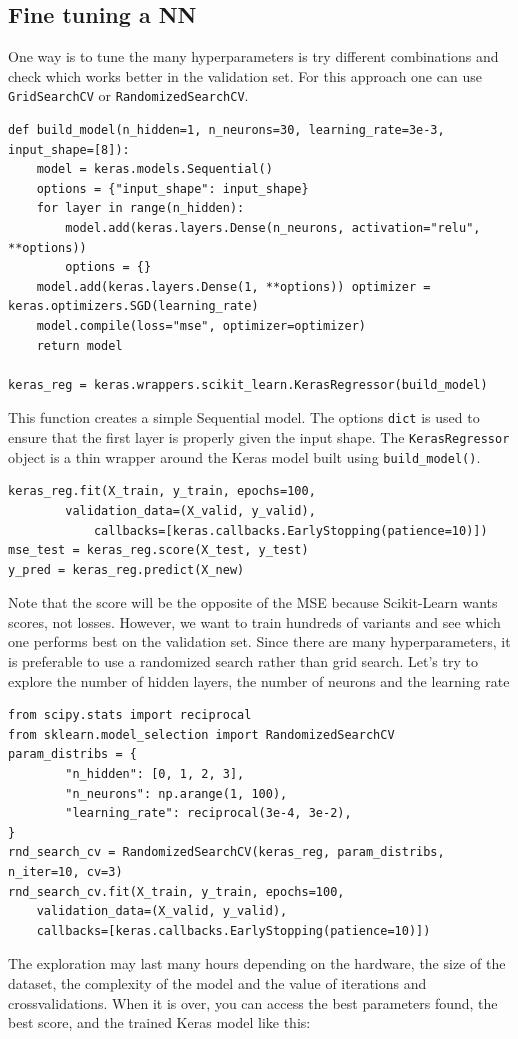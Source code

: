 \subsection{Fine tuning a NN}
One way is to tune the many hyperparameters is try different combinations and check which works better in the validation set. For this approach one can use \lstinline+GridSearchCV+ or \lstinline+RandomizedSearchCV+.
\begin{lstlisting}
def build_model(n_hidden=1, n_neurons=30, learning_rate=3e-3, input_shape=[8]): 
    model = keras.models.Sequential()
    options = {"input_shape": input_shape}
    for layer in range(n_hidden):
        model.add(keras.layers.Dense(n_neurons, activation="relu", **options))
        options = {} 
    model.add(keras.layers.Dense(1, **options)) optimizer = keras.optimizers.SGD(learning_rate)         
    model.compile(loss="mse", optimizer=optimizer) 
    return model
    
keras_reg = keras.wrappers.scikit_learn.KerasRegressor(build_model)
\end{lstlisting}
This function creates a simple Sequential model. The options \lstinline+dict+ is used to ensure that the first layer is properly given the input shape. The \lstinline+KerasRegressor+ object is a thin wrapper around the Keras model built using \lstinline+build_model()+.

\begin{lstlisting}
keras_reg.fit(X_train, y_train, epochs=100,
		validation_data=(X_valid, y_valid),
    		callbacks=[keras.callbacks.EarlyStopping(patience=10)])
mse_test = keras_reg.score(X_test, y_test)
y_pred = keras_reg.predict(X_new)
\end{lstlisting}

Note that the score will be the opposite of the MSE because Scikit-Learn wants scores, not losses. However, we want to train hundreds of variants and see which one performs best on the validation set. Since there are many hyperparameters, it is preferable to use a randomized search rather than grid search.
Let's try to explore the number of hidden layers, the number of neurons and the learning rate

\begin{lstlisting}
from scipy.stats import reciprocal
from sklearn.model_selection import RandomizedSearchCV
param_distribs = {
        "n_hidden": [0, 1, 2, 3],
        "n_neurons": np.arange(1, 100),
        "learning_rate": reciprocal(3e-4, 3e-2),
}
rnd_search_cv = RandomizedSearchCV(keras_reg, param_distribs, n_iter=10, cv=3)
rnd_search_cv.fit(X_train, y_train, epochs=100,
    validation_data=(X_valid, y_valid),
    callbacks=[keras.callbacks.EarlyStopping(patience=10)])
\end{lstlisting}
The exploration may last many hours depending on the hardware, the size of the dataset, the complexity of the model and the value of iterations and crossvalidations. When it is over, you can access the best parameters found, the best score, and the trained Keras model like this:


